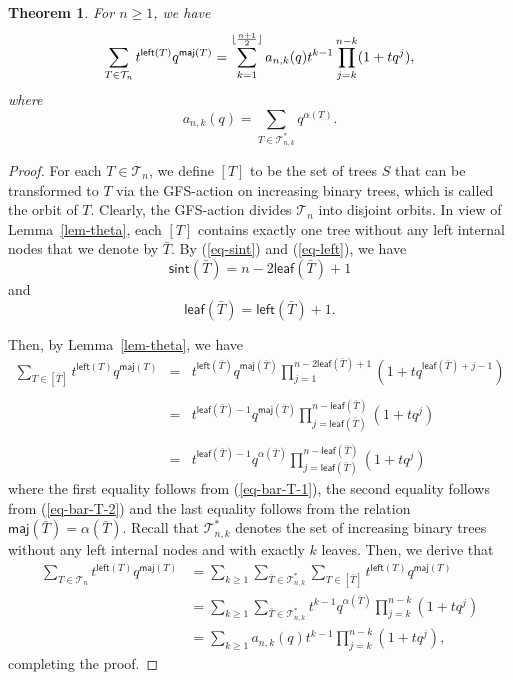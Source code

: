 \documentclass[12pt]{article}
\numberwithin{equation}{section}
\theoremstyle{plain}
\newtheorem{theorem}{Theorem}[section]
\def\maj{\mathsf{maj}}
\def\sint{\mathsf{sint}}
\def\l{\mathsf{left}}
\def\l{\mathsf{left}}
\def\B{\mathcal{T}}
\def\leaf{\mathsf{leaf}}
\begin{document}
	 	 \begin{theorem}\label{thm-expansion}
	 	 	For $n\geq 1$,  we have
	 	 		\begin{equation}\label{eq-expansion}
	 	 		\sum\limits_{T\in \B_n}t^{\l(T)}q^{\maj(T)}=\sum\limits_{k=1}^{\lfloor {n+1\over 2}\rfloor}  
	 	 		a_{n, k}(q)t^{k-1}\prod\limits_{j=k}^{n-k} (1+tq^j),
	 	 	\end{equation}
	 	 	where 
	 	 	$$
	 	 	a_{n,k}(q)=\sum_{T\in \B^*_{n,k}}q^{\alpha(T)}.
	 	 	$$
	 	 	\end{theorem}
	 	\begin{proof}
	 			For each $T\in\B_n$, we define $[T]$ to be the set of trees $S$ that can be transformed
	 		to $T$ via the GFS-action on  increasing binary trees, which is called the  orbit of $T$.  Clearly, the GFS-action
	 		divides $\B_n$ into disjoint orbits. In view of Lemma~\ref{lem-theta}, each $[T]$ contains exactly one
	 		tree without any left  internal nodes that we denote by $\bar{T}$.  By (\ref{eq-sint}) and (\ref{eq-left}), we have
	 		\begin{equation}\label{eq-bar-T-1}
	 			\sint(\bar{T})=n-2\leaf(\bar{T})+1 
	 		\end{equation}
	 		and 
	 		\begin{equation}\label{eq-bar-T-2}
	 			\leaf(\bar{T})=\l(\bar{T})+1.
	 		\end{equation}
	 		
	 		Then, by Lemma~\ref{lem-theta}, we have
	 		\[
	 		\begin{array}{lll}
	 			\sum\limits_{T\in [\bar{T}]} t^{\l(T)}q^{\maj(T)}
	 			&= & t^{\l(\bar{T})}q^{\maj(\bar{T})}\prod\limits_{j=1}^{n-2\leaf(\bar{T})+1}(1+tq^{\leaf(\bar{T})+j-1})\\
	 			&&\\
	 			&=  &t^{\leaf(\bar{T})-1}q^{\maj(\bar{T})}\prod\limits_{j=\leaf(\bar{T})}^{n-\leaf(\bar{T})}(1+tq^j)\\
	 			&&\\
	 			&=  &t^{\leaf(\bar{T})-1}q^{\alpha(\bar{T})}\prod\limits_{j=\leaf(\bar{T})}^{n-\leaf(\bar{T})}(1+tq^j)
	 		\end{array}
	 		\]
	 		where the first equality follows from (\ref{eq-bar-T-1}), the second equality follows from (\ref{eq-bar-T-2}) and the last equality follows from the relation $\maj(\bar{T})=\alpha(\bar{T})$.  Recall that $\B^*_{n,k}$ denotes the set of increasing binary trees without any left  internal nodes and with exactly $k$ leaves.
	 		Then, we derive that
	 		\[
	 		\begin{aligned}
	 			\sum\limits_{T\in \B_n}t^{\l(T)}q^{\maj(T)}
	 			&= \sum_{k\geq 1}\sum_{\bar{T}\in\B^*_{n,k} }\sum_{T\in [\bar{T}]} t^{\l(T)}q^{\maj(T)}\\
	 			&= \sum_{k\geq 1}\sum_{\bar{T}\in\B^*_{n,k} }t^{k-1}q^{\alpha(\bar{T})}\prod\limits_{j=k}^{n-k}(1+tq^j)\\
	 			&=  \sum_{k\geq 1} a_{n,k}(q)t^{k-1}\prod\limits_{j=k}^{n-k}(1+tq^j),
	 		\end{aligned}
	 		\]
	 		completing the proof. 
	 		
	 		\end{proof}
	 	
\end{document}
